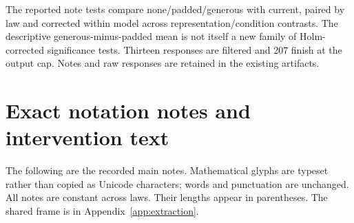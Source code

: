 \documentclass{article}
\newcommand{\code}[1]{\texttt{\detokenize{#1}}}
\begin{document}
The reported note tests compare none/padded/generous with current, paired by law
and corrected within model across representation/condition contrasts.
The descriptive generous-minus-padded mean is not itself a new family of
Holm-corrected significance tests. Thirteen responses are filtered and 207
finish at the output cap. Notes and raw responses are retained in the existing
artifacts.

\section{Exact notation notes and intervention text}
\label{app:promptnotes}

The following are the recorded main notes. Mathematical glyphs are typeset
rather than copied as Unicode characters; words and punctuation are unchanged.
All notes are constant across laws. Their \code{cl100k_base} lengths appear
in parentheses. The shared frame is in Appendix~\ref{app:extraction}.
\end{document}

